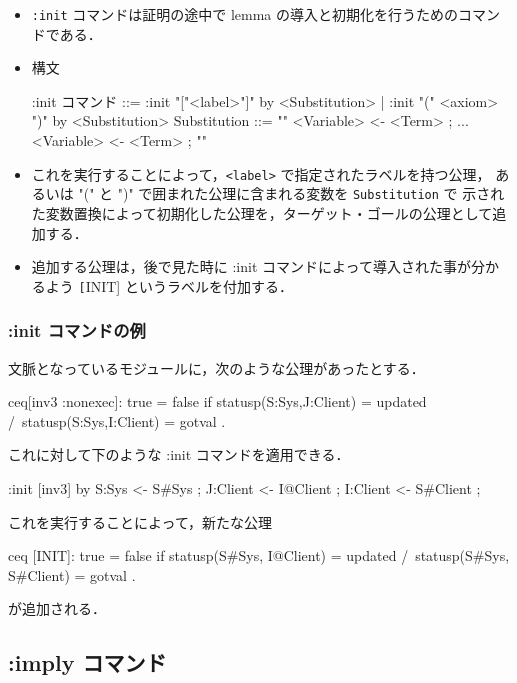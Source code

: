 \documentclass[a4paper,oneside,10pt,here]{memoir}
\newenvironment{vvtm}%
{\parskip=0pt\lineskip=0pt\begin{center}\begin{minipage}{0.8\textwidth}\begin{snugshade}}%
  {\end{snugshade}\end{minipage}\end{center}}
\begin{document}
\begin{itemize}
\item \verb|:init| コマンドは証明の途中で lemma の導入と初期化を行うためのコマンドである．
\item 構文
  \begin{vvtm}
    \begin{simplev}
 :init コマンド ::= :init "["<label>"]" by <Substitution>
                 |  :init "(" <axiom> ")" by <Substitution>
 Substitution ::= "{" <Variable> <- <Term> ; ... <Variable> <- <Term> ; "}"
    \end{simplev}
  \end{vvtm}
\item これを実行することによって，\verb|<label>| で指定されたラベルを持つ公理，
  あるいは "(" と ")" で囲まれた公理に含まれる変数を \verb|Substitution| で
  示された変数置換によって初期化した公理を，ターゲット・ゴールの公理として追加する．
\item 追加する公理は，後で見た時に :init コマンドによって導入された事が分かるよう
 \texttt[INIT] というラベルを付加する．
\end{itemize}

\subsubsection{:init コマンドの例}

文脈となっているモジュールに，次のような公理があったとする．
\begin{examplev}
ceq[inv3 :nonexec]: true = false if statusp(S:Sys,J:Client) = updated /\ 
                                              statusp(S:Sys,I:Client) = gotval .
\end{examplev}
これに対して下のような :init コマンドを適用できる．
\begin{examplev}
  :init [inv3] by {S:Sys <- S#Sys ; J:Client <- I@Client ; I:Client <- S#Client ;}
\end{examplev}
これを実行することによって，新たな公理
\begin{examplev}
ceq [INIT]: true = false if statusp(S#Sys, I@Client) = updated /\
                                  statusp(S#Sys, S#Client) = gotval .
\end{examplev}
が追加される．

\subsection{:imply コマンド}\label{sec:imply}
\end{document}
